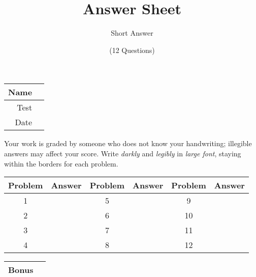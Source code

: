 \documentclass[a4paper, 12pt]{article}
\title{Answer Sheet}
\author{Short Answer}
\date{(12 Questions)}
\begin{document}
\maketitle

\begin{center}
\begin{tabular}{|r|r|}
\hline
	\hspace{3em} Name & \hspace{30em} \\\hline
	Test & \qquad \\ \hline
	Date & \qquad \\ \hline
\end{tabular}
\end{center}

Your work is graded by someone who does not know your handwriting; illegible answers may affect your score. Write \emph{darkly} and \emph{legibly} in \emph{large font}, staying within the borders for each problem.

\begin{center}
\begin{tabularx}{\textwidth}{|c|X|c|X|c|X|}\hline
	Problem & Answer & Problem & Answer & Problem & Answer \\\hline
	1 & \hspace{13.45em} & 5 & & 9 & \\\hline
	2 & & 6 & & 10 & \\\hline
	3 & & 7 & & 11 & \\\hline
	4 & & 8 & & 12 & \\\hline
\end{tabularx}
\end{center}

\begin{center}
\begin{tabular}{|r|r|}
\hline
	\hspace{3em} Bonus & \hspace{30em} \\\hline
\end{tabular}
\end{center}
\end{document}
